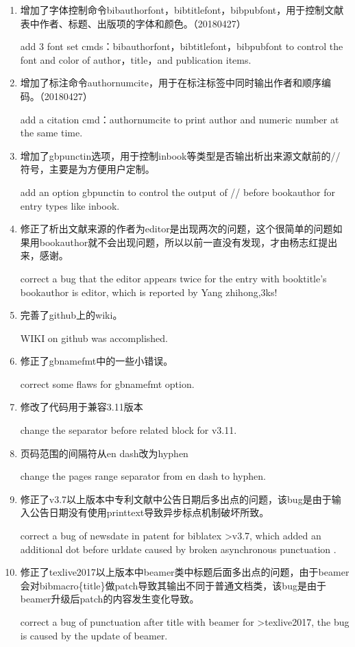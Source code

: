 \begin{enumerate}
\item 增加了字体控制命令bibauthorfont，bibtitlefont，bibpubfont，用于控制文献表中作者、标题、出版项的字体和颜色。（20180427）

add 3 font set cmds：bibauthorfont，bibtitlefont，bibpubfont to control the font and color of author，title，and publication items.

\item 增加了标注命令authornumcite，用于在标注标签中同时输出作者和顺序编码。（20180427）

add a citation cmd：authornumcite to print author and numeric number at the same time.

\item 增加了gbpunctin选项，用于控制inbook等类型是否输出析出来源文献前的//符号，主要是为方便用户定制。

add an option gbpunctin to control the output of // before bookauthor for entry types like inbook.

\item 修正了析出文献来源的作者为editor是出现两次的问题，这个很简单的问题如果用bookauthor就不会出现问题，所以以前一直没有发现，才由杨志红提出来，感谢。

correct a bug that the editor appears twice for the entry with booktitle's bookauthor is editor, which is reported by Yang zhihong,3ks!

\item 完善了github上的wiki。

WIKI on github was accomplished.

\item 修正了gbnamefmt中的一些小错误。

correct some flaws for gbnamefmt option.

\item 修改了代码用于兼容3.11版本

change the separator before related block for v3.11.

\item 页码范围的间隔符从en dash改为hyphen

change the pages range separator from en dash to hyphen.
	
\item 修正了v3.7以上版本中专利文献中公告日期后多出点的问题，该bug是由于输入公告日期没有使用printtext导致异步标点机制破坏所致。

correct a bug of newsdate in patent for biblatex >v3.7, which added an additional dot before urldate caused by broken asynchronous punctuation .

\item 修正了texlive2017以上版本中beamer类中标题后面多出点的问题，由于beamer会对bibmacro\{title\}做patch导致其输出不同于普通文档类，该bug是由于beamer升级后patch的内容发生变化导致。

correct a bug of punctuation after title with beamer for >texlive2017, the bug is caused by the update of beamer.
\end{enumerate}

